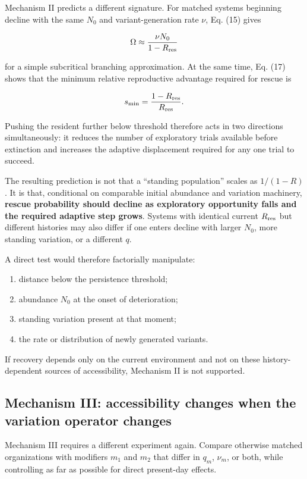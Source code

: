 \documentclass[11pt,a4paper]{article}
\providecommand{\tightlist}{%
  \setlength{\itemsep}{0pt}\setlength{\parskip}{0pt}}
\begin{document}
Mechanism II predicts a different signature. For matched systems
beginning decline with the same \(N_0\) and variant-generation rate
\(\nu\), Eq. (15) gives

\[
\Omega
\approx
\frac{\nu N_0}{1-R_{\rm res}}
\]

for a simple subcritical branching approximation. At the same time, Eq.
(17) shows that the minimum relative reproductive advantage required for
rescue is

\[
s_{\min}
=
\frac{1-R_{\rm res}}{R_{\rm res}}.
\]

Pushing the resident further below threshold therefore acts in two
directions simultaneously: it reduces the number of exploratory trials
available before extinction and increases the adaptive displacement
required for any one trial to succeed.

The resulting prediction is not that a ``standing population'' scales as
\(1/(1-R)\). It is that, conditional on comparable initial abundance and
variation machinery, \textbf{rescue probability should decline as
exploratory opportunity falls and the required adaptive step grows}.
Systems with identical current \(R_{\rm res}\) but different histories
may also differ if one enters decline with larger \(N_0\), more standing
variation, or a different \(q\).

A direct test would therefore factorially manipulate:

\begin{enumerate}
\def\labelenumi{\arabic{enumi}.}
\tightlist
\item
  distance below the persistence threshold;
\item
  abundance \(N_0\) at the onset of deterioration;
\item
  standing variation present at that moment;
\item
  the rate or distribution of newly generated variants.
\end{enumerate}

If recovery depends only on the current environment and not on these
history-dependent sources of accessibility, Mechanism II is not
supported.

\subsection{Mechanism III: accessibility changes when the variation
operator
changes}\label{mechanism-iii-accessibility-changes-when-the-variation-operator-changes}

Mechanism III requires a different experiment again. Compare otherwise
matched organizations with modifiers \(m_1\) and \(m_2\) that differ in
\(q_m\), \(\nu_m\), or both, while controlling as far as possible for
direct present-day effects.
\end{document}
